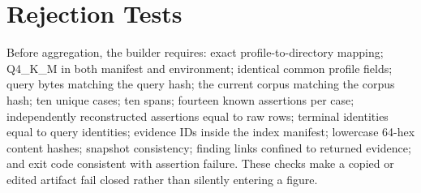 \documentclass[10pt,twocolumn]{article}
\begin{document}
\section{Rejection Tests}
Before aggregation, the builder requires: exact profile-to-directory mapping; Q4\_K\_M in both manifest and environment; identical common profile fields; query bytes matching the query hash; the current corpus matching the corpus hash; ten unique cases; ten spans; fourteen known assertions per case; independently reconstructed assertions equal to raw rows; terminal identities equal to query identities; evidence IDs inside the index manifest; lowercase 64-hex content hashes; snapshot consistency; finding links confined to returned evidence; and exit code consistent with assertion failure.  These checks make a copied or edited artifact fail closed rather than silently entering a figure.

\balance


\end{document}
